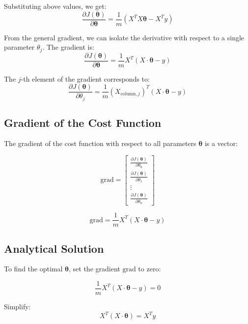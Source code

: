Substituting above values, we get:
\begin{equation}
\frac{\partial J(\boldsymbol{\theta})}{\partial \boldsymbol{\theta}} = \frac{1}{m} \left( X^T X \boldsymbol{\theta} - X^T y \right)
\end{equation}


From the general gradient, we can isolate the derivative with respect to a single parameter \( \theta_j \). The gradient is:
\[
\frac{\partial J(\boldsymbol{\theta})}{\partial \boldsymbol{\theta}} = \frac{1}{m} X^T (X \cdot \boldsymbol{\theta} - y)
\]

The \( j \)-th element of the gradient corresponds to:
\[
\frac{\partial J(\boldsymbol{\theta})}{\partial \theta_j} = \frac{1}{m} (X_{\text{column}, j})^T (X \cdot \boldsymbol{\theta} - y)
\]

\subsection{Gradient of the Cost Function}

The gradient of the cost function with respect to all parameters \(\boldsymbol{\theta}\) is a vector:

\begin{equation}
    \text{grad} = \begin{bmatrix}
\frac{\partial J(\boldsymbol{\theta})}{\partial \theta_0} \\
\frac{\partial J(\boldsymbol{\theta})}{\partial \theta_1} \\
\vdots \\
\frac{\partial J(\boldsymbol{\theta})}{\partial \theta_n}
\end{bmatrix}
\end{equation}

\begin{equation}
    \text{grad} = \frac{1}{m} X^T (X \cdot \boldsymbol{\theta} - y)
\end{equation}

\subsection{Analytical Solution}

To find the optimal \(\boldsymbol{\theta}\), set the gradient \(\text{grad}\) to zero:

\[
\frac{1}{m} X^T (X \cdot \boldsymbol{\theta} - y) = 0
\]

Simplify:
\[
X^T (X \cdot \boldsymbol{\theta}) = X^T y
\]

